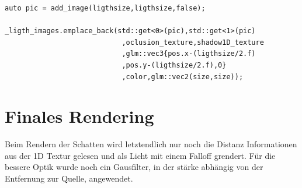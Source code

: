 \begin{lstlisting}
auto pic = add_image(ligthsize,ligthsize,false);

_ligth_images.emplace_back(std::get<0>(pic),std::get<1>(pic)
							,oclusion_texture,shadow1D_texture
							,glm::vec3{pos.x-(ligthsize/2.f)
							,pos.y-(ligthsize/2.f),0}
							,color,glm::vec2(size,size));
\end{lstlisting}

\section{Finales Rendering}
Beim Rendern der Schatten wird letztendlich nur noch die Distanz Informationen aus der 1D Textur gelesen und als Licht mit einem Falloff grendert. Für die bessere Optik wurde noch ein Gausfilter, in der stärke abhängig von der Entfernung zur Quelle, angewendet.

